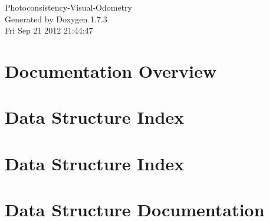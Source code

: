 \documentclass[a4paper]{book}
\begin{document}
\hypersetup{pageanchor=false}
\begin{titlepage}
\vspace*{7cm}
\begin{center}
{\Large Photoconsistency-\/Visual-\/Odometry }\\
\vspace*{1cm}
{\large Generated by Doxygen 1.7.3}\\
\vspace*{0.5cm}
{\small Fri Sep 21 2012 21:44:47}\\
\end{center}
\end{titlepage}
\clearemptydoublepage
{}
\tableofcontents
\clearemptydoublepage
{}
\hypersetup{pageanchor=true}
\chapter{Documentation Overview}
\label{index}\hypertarget{index}{}
\chapter{Data Structure Index}

\chapter{Data Structure Index}

\chapter{Data Structure Documentation}












\printindex
\end{document}
